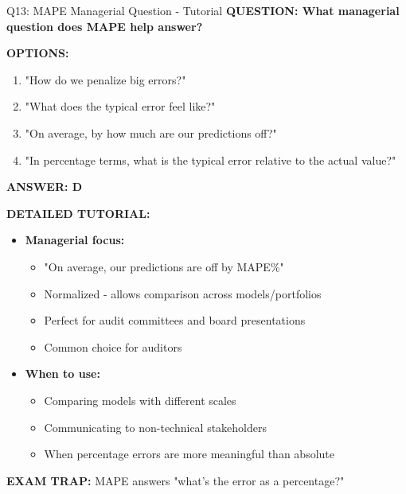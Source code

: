 \documentclass[8pt]{beamer}
\begin{document}
	\begin{frame}{Q13: MAPE Managerial Question - Tutorial}
		\fontsize{6.5}{7.5}\selectfont
		\textbf{QUESTION: What managerial question does MAPE help answer?}
		
		\vspace{0.1cm}
		\textbf{OPTIONS:}
		\begin{enumerate}
			\item "How do we penalize big errors?"
			\item "What does the typical error feel like?"
			\item "On average, by how much are our predictions off?"
			\item "In percentage terms, what is the typical error relative to the actual value?"
		\end{enumerate}
		
		\vspace{0.1cm}
		\textcolor{myblue}{\textbf{ANSWER: D}}
		
		\vspace{0.1cm}
		\textbf{DETAILED TUTORIAL:}
		\begin{itemize}
			\item \textbf{Managerial focus:}
			\begin{itemize}
				\item "On average, our predictions are off by MAPE\%"
				\item Normalized - allows comparison across models/portfolios
				\item Perfect for audit committees and board presentations
				\item Common choice for auditors
			\end{itemize}
			\item \textbf{When to use:}
			\begin{itemize}
				\item Comparing models with different scales
				\item Communicating to non-technical stakeholders
				\item When percentage errors are more meaningful than absolute
			\end{itemize}
		\end{itemize}
		
		\textcolor{myred}{\textbf{EXAM TRAP:}} MAPE answers \textcolor{myblue}{"what's the error as a percentage?"}
	\end{frame}
	
\end{document}
